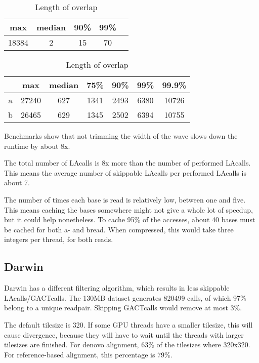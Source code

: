\documentclass[../main/thesis.tex]{subfiles}
\begin{document}
\begin{table}[h]
\bigskip
\caption{Number of skippable LAcalls per performed LAcall}
\label{tbl:daligner_dist6}
\centering
\vspace{-5pt}
\begin{tabular}{c|c c c c}
max & median & 90\% & 99\% \\ \hline
18384 & 2 & 15 & 70 \\
\end{tabular}

\bigskip
\caption{Length of overlap}
\label{tbl:daligner_dist7}
\centering
\vspace{-5pt}
\begin{tabular}{c|c c c c c c}
& max & median & 75\% & 90\% & 99\% & 99.9\% \\ \hline
a & 27240 & 627 & 1341 & 2493 & 6380 & 10726 \\
b & 26465 & 629 & 1345 & 2502 & 6394 & 10755 \\
\end{tabular}
\end{table}


Benchmarks show that not trimming the width of the wave slows down the runtime by about 8x.

The total number of LAcalls is 8x more than the number of performed LAcalls.
This means the average number of skippable LAcalls per performed LAcalls is about 7.

The number of times each base is read is relatively low, between one and five.
This means caching the bases somewhere might not give a whole lot of speedup, but it could help nonetheless.
To cache 95\% of the accesses, about 40 bases must be cached for both a- and bread.
When compressed, this would take three integers per thread, for both reads.

\subsection{Darwin}
Darwin has a different filtering algorithm, which results in less skippable LAcalls/GACTcalls.
The 130MB dataset generates 820499 calls, of which 97\% belong to a unique readpair.
Skipping GACTcalls would remove at most 3\%.


The default tilesize is 320.
If some GPU threads have a smaller tilesize, this will cause divergence, because they will have to wait until the threads with larger tilesizes are finished.
For denovo alignment, 63\% of the tilesizes where 320x320.
For reference-based alignment, this percentage is 79\%.
\end{document}
